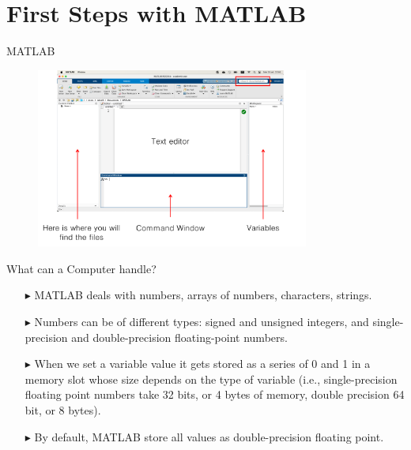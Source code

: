 \documentclass[aspectratio=169]{beamer}
\begin{document}
\section{First Steps with MATLAB}
\begin{frame}{MATLAB}
    \begin{figure}
        \centering
        \includegraphics[width=0.8\textwidth]{figures/matlab.pdf}
    \end{figure}
\end{frame}

\begin{frame}{What can a Computer handle?}
    \begin{itemize}[<+->]
        \item[$\blacktriangleright$]
        MATLAB deals with numbers, arrays of numbers, characters, strings.
        
        \item[$\blacktriangleright$]
        Numbers can be of different types: signed and unsigned integers, and single-precision and double-precision floating-point numbers.
        
        \item[$\blacktriangleright$]
        When we set a variable value it gets stored as a series of 0 and 1 in a memory slot whose size depends on the type of variable (i.e., single-precision floating point numbers take 32 bits, or 4 bytes of memory, double precision 64 bit, or 8 bytes).
              
        \item[$\blacktriangleright$]
        By default, MATLAB store all values as double-precision floating point.
    \end{itemize}
\end{frame}
\end{document}
